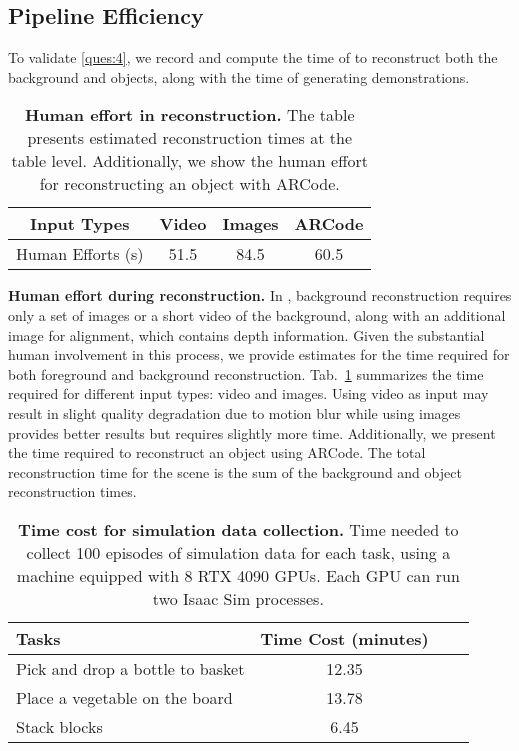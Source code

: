 \subsection{Pipeline Efficiency}

To validate \ref{ques:4}, we record and compute the time of \our to reconstruct both the background and objects, along with the time of generating demonstrations.

\begin{table}[tb]
    \caption{\textbf{Human effort in reconstruction.} The table presents estimated reconstruction times at the table level. Additionally, we show the human effort for reconstructing an object with ARCode.}
    \label{tab:human-effort}
    \centering
    \begin{tabular}{cccc}
    \toprule
    Input Types & Video & Images & ARCode \\
    \midrule
    Human Efforts (s) & 51.5 & 84.5 & 60.5 \\
    \bottomrule
    \end{tabular}
\end{table}

\noindent\textbf{Human effort during reconstruction.} In \our, background reconstruction requires only a set of images or a short video of the background, along with an additional image for alignment, which contains depth information. Given the substantial human involvement in this process, we provide estimates for the time required for both foreground and background reconstruction. Tab.~\ref{tab:human-effort} summarizes the time required for different input types: video and images. Using video as input may result in slight quality degradation due to motion blur while using images provides better results but requires slightly more time. Additionally, we present the time required to reconstruct an object using ARCode. The total reconstruction time for the scene is the sum of the background and object reconstruction times.

\begin{table}[tb]
    \caption{\textbf{Time cost for simulation data collection.} Time needed to collect 100 episodes of simulation data for each task, using a machine equipped with 8 RTX 4090 GPUs. Each GPU can run two Isaac Sim processes.}
    \label{tab:data-collection-time}
    \centering
    \begin{tabular}{lccc}
    \toprule
        Tasks & Time Cost (minutes) \\
    \midrule 
    Pick and drop a bottle to basket  & 12.35 \\
    Place a vegetable on the board & 13.78\\
    Stack blocks & 6.45 \\
    \bottomrule 
    \end{tabular}
\vskip -0.1in
\end{table}

